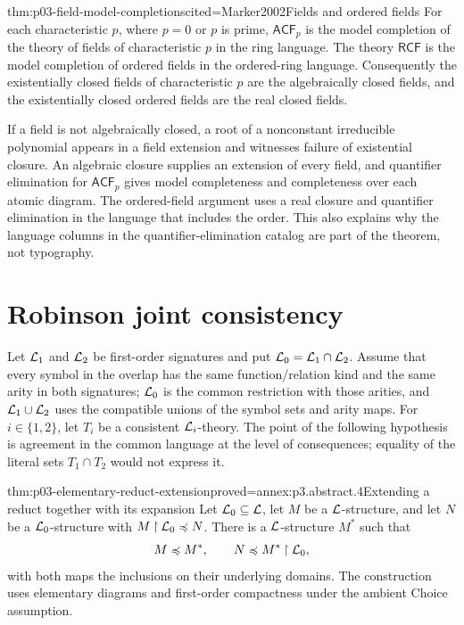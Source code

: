 \begin{hbtheorem}{thm:p03-field-model-completions}{cited=Marker2002}{Fields and ordered fields}
For each characteristic \(p\), where \(p=0\) or \(p\) is prime,
\(\mathsf{ACF}_p\) is the model completion of the theory of fields of
characteristic \(p\) in the ring language.  The theory \(\mathsf{RCF}\) is
the model completion of ordered fields in the ordered-ring language.
Consequently the existentially closed fields of characteristic \(p\) are the
algebraically closed fields, and the existentially closed ordered fields are
the real closed fields.
\end{hbtheorem}

If a field is not algebraically closed, a root of a nonconstant irreducible
polynomial appears in a field extension and witnesses failure of existential
closure.  An algebraic closure supplies an extension of every field, and
quantifier elimination for \(\mathsf{ACF}_p\) gives model completeness and
completeness over each atomic diagram.  The ordered-field argument uses a real
closure and quantifier elimination in the language that includes the order.
This also explains why the language columns in the quantifier-elimination
catalog are part of the theorem, not typography.

\section{Robinson joint consistency}
\label{sec:p03-robinson-joint-consistency}

Let \(\mathcal{L}_1\) and \(\mathcal{L}_2\) be first-order signatures and put
\(\mathcal{L}_0=\mathcal{L}_1\cap\mathcal{L}_2\).  Assume that every symbol in the overlap has
the same function/relation kind and the same arity in both signatures;
\(\mathcal{L}_0\) is the common restriction with those arities, and
\(\mathcal{L}_1\cup\mathcal{L}_2\) uses the compatible unions of the symbol sets and arity
maps.  For \(i\in\{1,2\}\), let \(T_i\) be a
consistent \(\mathcal{L}_i\)-theory.  The point of the following hypothesis is
agreement in the common language at the level of consequences; equality of
the literal sets \(T_1\cap T_2\) would not express it.

\begin{hblemma}{thm:p03-elementary-reduct-extension}{proved=annex:p3.abstract.4}{Extending a reduct together with its expansion}
Let \(\mathcal{L}_0\subseteq\mathcal{L}\), let \(M\) be a \(\mathcal{L}\)-structure, and
let \(N\) be a \(\mathcal{L}_0\)-structure with
\(M\mathbin{\upharpoonright}\mathcal{L}_0\preccurlyeq N\).
There is a \(\mathcal{L}\)-structure \(M^*\) such that
\[
 M\preccurlyeq M^*,
 \qquad
 N\preccurlyeq M^*\mathbin{\upharpoonright}\mathcal{L}_0,
\]
with both maps the inclusions on their underlying domains.
The construction uses elementary diagrams and first-order compactness
under the ambient Choice assumption.
\end{hblemma}

